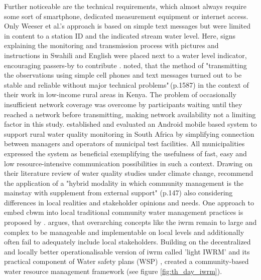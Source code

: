 Further noticeable are the technical requirements, which almost always require some sort of smartphone, dedicated measurement equipment or internet access. Only Weeser et al.'s \citeyear{weeserCitizenSciencePioneers2018a} approach is based on simple text messages but were limited in content to a station ID and the indicated stream water level. Here, signs explaining the monitoring and transmission process with pictures and instructions in Swahili and English were placed next to a water level indicator, encouraging passers-by to contribute \autocite{weeserCitizenSciencePioneers2018a}. \Textcite{weeserCitizenSciencePioneers2018a} noted, that the method of "transmitting the observations using simple cell phones and text messages turned out to be stable and reliable without major technical problems"\,(p.1587) in the context of their work in low-income rural areas in Kenya. The problem of occasionally insufficient network coverage was overcome by participants waiting until they reached a network before transmitting, making network availability not a limiting factor in this study. \autocite{wilson-jonesUsingMobilePhones2012} established and evaluated an Android mobile based system to support rural water quality monitoring in South Africa by simplifying connection between managers and operators of municipal test facilities. All municipalities expressed the system as beneficial exemplifying the usefulness of fast, easy and low resource-intensive communication possibilities in such a context.\newline
Drawing on their literature review of water quality studies under climate change, \textcite{huangManagementDrinkingWater2020} recommend the application of a "hybrid modality in which community management is the mainstay with supplement from external support" (p.147) also considering differences in local realities and stakeholder opinions and needs. One approach to embed \acrshort{cbwm} into local traditional community water management practices is proposed by \autocite{dayCommunitybasedWaterResources2009}. \Textcite{dayCommunitybasedWaterResources2009} argues, that overarching concepts like the \acrfull{iwrm} remain to large and complex to be manageable and implementable on local levels and additionally often fail to adequately include local stakeholders. Building on the decentralized and locally better operationalisable version of \acrshort{iwrm} called 'light IWRM' \autocite{butterworthFindingPracticalApproaches2010,moriartyIntegratedWaterResources2004} and its practical component of Water safety plans (WSP) \autocite{bartramWaterSafetyPlan2009}, \textcite{dayCommunitybasedWaterResources2009} created a community-based water resource management framework (see figure \ref{fig:th_day_iwrm}). 


